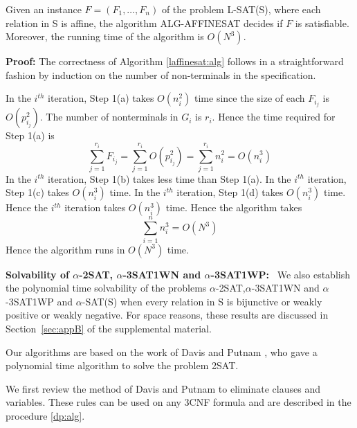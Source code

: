 \newspacing



\begin{theorem}\label{th:haffineeasy}
Given an instance $F = (F_1, \ldots, F_n)$ of the problem L-SAT(S), where
each relation in S is affine, the algorithm ALG-AFFINESAT decides if $F$ is 
satisfiable. Moreover, the running time of the algorithm is $O(N^3)$.
\end{theorem}


\noindent
{\bf Proof:}
The correctness of Algorithm \ref{laffinesat:alg} 
follows in a straightforward fashion by induction on the number of 
non-terminals in the specification.

In the $i^{th}$ iteration,
Step 1(a) takes $O(n_i^2)$ time since the size of each 
$F_{i_j}$ is $O(p_{i_j}^2)$.
The number of nonterminals in $G_i$ is $r_i$. Hence the time 
required for Step 1(a) is
\[ \sum_{j=1}^{r_i} F_{i_j} = 
\sum_{j=1}^{r_i} O(p_{i_j}^2) = \sum_{j=1}^{r_i} n_i^2 = O(n_i^3)\]
In the $i^{th}$ iteration, Step 1(b) takes less time than Step 1(a).
In the $i^{th}$ iteration, Step 1(c) takes $O(n_i^3)$ time.
In the $i^{th}$ iteration, Step 1(d) takes $O(n_i^3)$ time.
Hence the $i^{th}$ iteration takes $O(n_i^3)$ time. Hence the algorithm takes
\[ \sum_{i=1}^n n_i^3 = O(N^3) \]
Hence the algorithm runs in $O(N^3)$ time. \hfill\QED


\smallskip

\noindent
\textbf{Solvability of $\alpha$-2SAT,
$\alpha$-{\sf 3SAT1WN} and $\alpha$-{\sf 3SAT1WP}:}~
We also establish the polynomial time solvability of the problems 
$\alpha$-{\sf 2SAT},$\alpha$-{\sf 3SAT1WN} and $\alpha$-{\sf 3SAT1WP} 
and $\alpha$-{\sf SAT(S)} 
when every relation in {\sf S} is bijunctive or weakly positive or 
weakly negative.
For space reasons, these results are discussed in Section~\ref{sec:appB}
of the supplemental material.

\iffalse
Our algorithms are based on the work of Davis and Putnam \cite{DP},
who gave a polynomial time algorithm to solve the problem {\sf 2SAT}.


We first review the method of Davis and Putnam\cite{DP} to eliminate clauses
and variables. These rules can be used on any {\sf 3CNF}  formula and 
are described  in the procedure \ref{dp:alg}.

